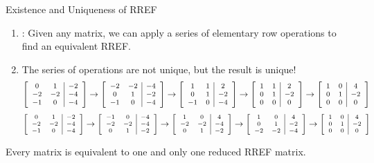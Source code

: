 \documentclass[xcoler=dvipsnames, aspectratio=169]{beamer}
\begin{document}
    \begin{frame}{Existence and Uniqueness of RREF}
        \small
        \begin{enumerate}
            \item {}: Given any matrix, we can apply a series of elementary row operations to find an equivalent RREF.
                \pause
            \item The series of operations are not unique, but the result is unique!
                \pause
                \[
                    \footnotesize
                    \aMat{cc|c}{
                        0 & 1 & -2\\
                        -2&-2 & -4\\
                        -1 &0 & -4
                    }\rightarrow\aMat{cc|c}{
                        -2&-2 & -4\\
                        0 & 1 & -2\\
                        -1 &0 & -4
                    }\rightarrow\aMat{cc|c}{
                        1 & 1 &  2\\
                        0 & 1 & -2\\
                        -1 &0 & -4
                    }\rightarrow\aMat{cc|c}{
                        1 & 1 &  2\\
                        0 & 1 & -2\\
                        0 & 0 &  0
                    }\rightarrow\aMat{cc|c}{
                        1 & 0 &  4\\
                        0 & 1 & -2\\
                        0 & 0 &  0
                    }
                \]
                \pause
                \[
                    \scriptsize
                    \aMat{cc|c}{
                        0 & 1 & -2\\
                        -2&-2 & -4\\
                        -1 &0 & -4
                    }\rightarrow\aMat{cc|c}{
                        -1 &0 & -4\\
                        -2&-2 & -4\\
                        0 & 1 & -2
                    }\rightarrow\aMat{cc|c}{
                        1 &0 & 4\\
                        -2&-2 & -4\\
                        0 & 1 & -2
                    }\rightarrow\aMat{cc|c}{
                        1 &0 & 4\\
                        0 & 1 & -2\\
                        -2&-2 & -4
                    }\rightarrow\aMat{cc|c}{
                        1 &0 & 4\\
                        0 & 1 & -2\\
                        0 & 0 & 0
                    }
                \]
        \end{enumerate}
                \pause
        \begin{theorem}
            Every matrix is equivalent to one and only one reduced RREF matrix.
        \end{theorem}
    \end{frame}
\end{document}
